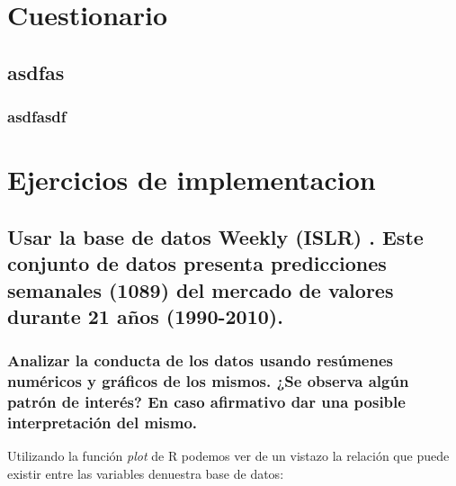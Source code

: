 \newpage %

\tableofcontents %

\listoffigures


\newpage




\section{Cuestionario}

\subsection{asdfas}


\subsubsection{asdfasdf}

\section{Ejercicios de implementacion}

\subsection{Usar la base de datos Weekly (ISLR) . Este conjunto de datos presenta predicciones semanales (1089) del mercado de valores durante 21 años (1990-2010).}

\subsubsection{Analizar la conducta de los datos usando resúmenes numéricos y gráficos de los mismos. ¿Se observa algún patrón de interés? En caso afirmativo dar una posible interpretación del mismo.}
Utilizando la función \emph{plot} de R podemos ver de un vistazo la relación que puede existir entre las variables denuestra base de datos:

